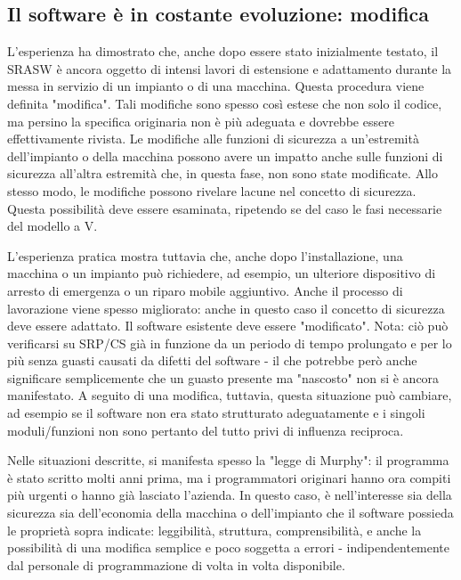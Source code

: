 \subsection{Il software è in costante evoluzione: modifica}
\label{subsec:06-3-9}
L'esperienza ha dimostrato che, anche dopo essere stato inizialmente testato, il SRASW è ancora oggetto di intensi lavori di estensione e adattamento durante la messa in servizio di un impianto o di una macchina. Questa procedura viene definita "modifica". Tali modifiche sono spesso così estese che non solo il codice, ma persino la specifica originaria non è più adeguata e dovrebbe essere effettivamente rivista. Le modifiche alle funzioni di sicurezza a un'estremità dell'impianto o della macchina possono avere un impatto anche sulle funzioni di sicurezza all'altra estremità che, in questa fase, non sono state modificate. Allo stesso modo, le modifiche possono rivelare lacune nel concetto di sicurezza. Questa possibilità deve essere esaminata, ripetendo se del caso le fasi necessarie del modello a V.

L'esperienza pratica mostra tuttavia che, anche dopo l'installazione, una macchina o un impianto può richiedere, ad esempio, un ulteriore dispositivo di arresto di emergenza o un riparo mobile aggiuntivo. Anche il processo di lavorazione viene spesso migliorato: anche in questo caso il concetto di sicurezza deve essere adattato. Il software esistente deve essere "modificato". Nota: ciò può verificarsi su SRP/CS già in funzione da un periodo di tempo prolungato e per lo più senza guasti causati da difetti del software - il che potrebbe però anche significare semplicemente che un guasto presente ma "nascosto" non si è ancora manifestato. A seguito di una modifica, tuttavia, questa situazione può cambiare, ad esempio se il software non era stato strutturato adeguatamente e i singoli moduli/funzioni non sono pertanto del tutto privi di influenza reciproca.

Nelle situazioni descritte, si manifesta spesso la "legge di Murphy": il programma è stato scritto molti anni prima, ma i programmatori originari hanno ora compiti più urgenti o hanno già lasciato l'azienda. In questo caso, è nell'interesse sia della sicurezza sia dell'economia della macchina o dell'impianto che il software possieda le proprietà sopra indicate: leggibilità, struttura, comprensibilità, e anche la possibilità di una modifica semplice e poco soggetta a errori - indipendentemente dal personale di programmazione di volta in volta disponibile.

